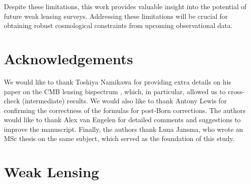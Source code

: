 \documentclass[11pt]{article} %
\begin{document}
Despite these limitations, this work provides valuable insight into the potential of future weak lensing surveys. Addressing these limitations will be crucial for obtaining robust cosmological constraints from upcoming observational data.

\section*{Acknowledgements}
We would like to thank Toshiya Namikawa for providing extra details on his paper on the CMB lensing bispectrum \cite{Namikawa_2016}, which, in particular, allowed us to cross-check (intermediate) results. We would also like to thank Antony Lewis for confirming the correctness of the formulas for post-Born corrections. The authors would like to thank Alex van Engelen for detailed comments and suggestions to improve the manuscript. Finally, the authors thank Luna Jansma, who wrote an MSc thesis on the same subject, which served as the foundation of this study. 

\printbibliography

\appendix

\section{Weak Lensing}\label{sec:weaklensing}
\end{document}

